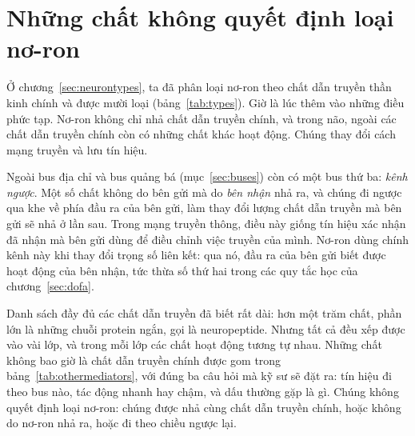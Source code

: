 \chapter{Những chất không quyết định loại nơ-ron}
\label{sec:othermediators}

Ở chương~\ref{sec:neurontypes}, ta đã phân loại nơ-ron theo chất dẫn truyền thần kinh chính và được mười loại (bảng~\ref{tab:types}). Giờ là lúc thêm vào những điều phức tạp. Nơ-ron không chỉ nhả chất dẫn truyền chính, và trong não, ngoài các chất dẫn truyền chính còn có những chất khác hoạt động. Chúng thay đổi cách mạng truyền và lưu tín hiệu.

Ngoài bus địa chỉ và bus quảng bá (mục~\ref{sec:buses}) còn có một bus thứ ba: \emph{kênh ngược}. Một số chất không do bên gửi mà do \emph{bên nhận} nhả ra, và chúng đi ngược qua khe về phía đầu ra của bên gửi, làm thay đổi lượng chất dẫn truyền mà bên gửi sẽ nhả ở lần sau. Trong mạng truyền thông, điều này giống tín hiệu xác nhận đã nhận mà bên gửi dùng để điều chỉnh việc truyền của mình. Nơ-ron dùng chính kênh này khi thay đổi trọng số liên kết: qua nó, đầu ra của bên gửi biết được hoạt động của bên nhận, tức thừa số thứ hai trong các quy tắc học của chương~\ref{sec:dofa}.

Danh sách đầy đủ các chất dẫn truyền đã biết rất dài: hơn một trăm chất, phần lớn là những chuỗi protein ngắn, gọi là neuropeptide. Nhưng tất cả đều xếp được vào vài lớp, và trong mỗi lớp các chất hoạt động tương tự nhau. Những chất không bao giờ là chất dẫn truyền chính được gom trong bảng~\ref{tab:othermediators}, với đúng ba câu hỏi mà kỹ sư sẽ đặt ra: tín hiệu đi theo bus nào, tác động nhanh hay chậm, và dấu thường gặp là gì. Chúng không quyết định loại nơ-ron: chúng được nhả cùng chất dẫn truyền chính, hoặc không do nơ-ron nhả ra, hoặc đi theo chiều ngược lại.

